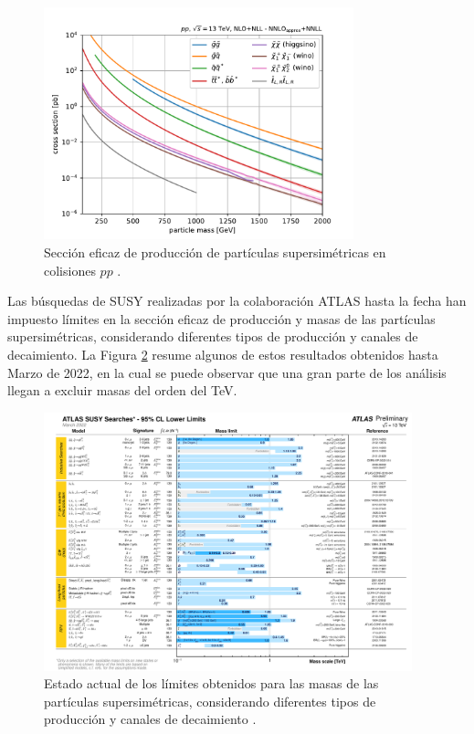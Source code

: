 \begin{figure}
  \centering
  \includegraphics[width=0.8\textwidth]{images/theory/SUSY_xsecs_13TeV_overview.pdf}
  \caption{Sección eficaz de producción de partículas supersimétricas en colisiones $pp$ \cite{susy_xs_web}.}
  \label{fig:susy_xs}
\end{figure}


Las búsquedas de SUSY realizadas por la colaboración ATLAS hasta la fecha han impuesto límites en la sección eficaz de producción y masas de las partículas supersimétricas, considerando diferentes tipos de producción y canales de decaimiento. La Figura \ref{fig:susy_xs_limits} resume algunos de estos resultados obtenidos hasta Marzo de 2022, en la cual se puede observar que una gran parte de los análisis llegan a excluir masas del orden del TeV.


\begin{figure}
	\centering
  \includegraphics[width=0.95\textwidth]{images/theory/susy_xs_limits_2.pdf}
  \caption{Estado actual de los límites obtenidos para las masas de las partículas supersimétricas, considerando diferentes tipos de producción y canales de decaimiento \cite{susy_xs_limits}.}
  \label{fig:susy_xs_limits}
\end{figure}